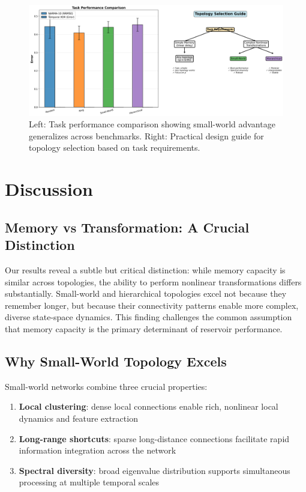\documentclass{article}
\begin{document}
\begin{figure}[t]
\centering
\includegraphics[width=\textwidth]{validation_and_guide.png}
\caption{Left: Task performance comparison showing small-world advantage generalizes across benchmarks. Right: Practical design guide for topology selection based on task requirements.}
\label{fig:validation}
\end{figure}

\section{Discussion}

\subsection{Memory vs Transformation: A Crucial Distinction}

Our results reveal a subtle but critical distinction: while memory capacity is similar across topologies, the ability to perform nonlinear transformations differs substantially. Small-world and hierarchical topologies excel not because they remember longer, but because their connectivity patterns enable more complex, diverse state-space dynamics. This finding challenges the common assumption that memory capacity is the primary determinant of reservoir performance.

\subsection{Why Small-World Topology Excels}

Small-world networks combine three crucial properties:
\begin{enumerate}
\item \textbf{Local clustering}: dense local connections enable rich, nonlinear local dynamics and feature extraction
\item \textbf{Long-range shortcuts}: sparse long-distance connections facilitate rapid information integration across the network
\item \textbf{Spectral diversity}: broad eigenvalue distribution supports simultaneous processing at multiple temporal scales
\end{enumerate}
\end{document}
